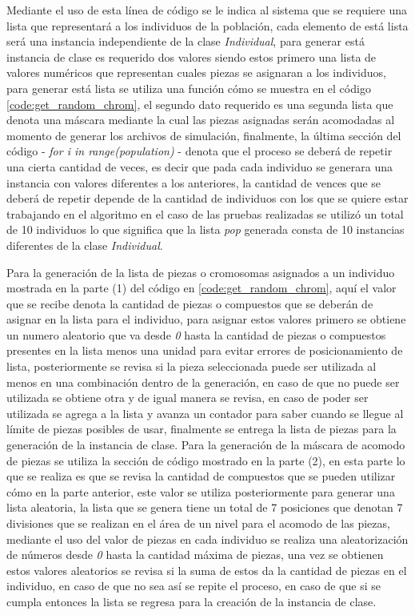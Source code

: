 Mediante el uso de esta línea de código se le indica al sistema que se requiere
una lista que representará a los individuos de la población, cada elemento de
está lista será una instancia independiente de la clase \textit{Individual},
para generar está instancia de clase es requerido dos valores siendo estos
primero una lista de valores numéricos que representan cuales piezas se
asignaran a los individuos, para generar está lista se utiliza una función cómo
se muestra en el código \ref{code:get_random_chrom}, el segundo dato requerido
es una segunda lista que denota una máscara mediante la cual las piezas
asignadas serán acomodadas al momento de generar los archivos de simulación,
finalmente, la última sección del código - \textit{for i in range(population)} -
denota que el proceso se deberá de repetir una cierta cantidad de veces, es
decir que pada cada individuo se generara una instancia con valores diferentes a
los anteriores, la cantidad de vences que se deberá de repetir depende de la
cantidad de individuos con los que se quiere estar trabajando en el algoritmo en
el caso de las pruebas realizadas se utilizó un total de 10 individuos lo que
significa que la lista \textit{pop} generada consta de 10 instancias diferentes
de la clase \textit{Individual}. 

Para la generación de la lista de piezas o cromosomas asignados a un individuo
mostrada en la parte (1) del código en \ref{code:get_random_chrom}, aquí el
valor que se recibe denota la cantidad de piezas o compuestos que se deberán de
asignar en la lista para el individuo, para asignar estos valores primero se
obtiene un numero aleatorio que va desde \textit{0} hasta la cantidad de piezas o
compuestos presentes en la lista menos una unidad para evitar errores de
posicionamiento de lista, posteriormente se revisa si la pieza seleccionada
puede ser utilizada al menos en una combinación dentro de la generación, en caso
de que no puede ser utilizada se obtiene otra y de igual manera se revisa, en
caso de poder ser utilizada se agrega a la lista y avanza un contador para saber
cuando se llegue al límite de piezas posibles de usar, finalmente se entrega la
lista de piezas para la generación de la instancia de clase. Para la generación
de la máscara de acomodo de piezas se utiliza la sección de código mostrado en
la parte (2), en esta parte lo que se realiza es que se revisa la cantidad de
compuestos que se pueden utilizar cómo en la parte anterior, este valor se
utiliza posteriormente para generar una lista aleatoria, la lista que se genera
tiene un total de 7 posiciones que denotan 7 divisiones que se realizan en el
área de un nivel para el acomodo de las piezas, mediante el uso del valor de
piezas en cada individuo se realiza una aleatorización de números desde
\textit{0} hasta la cantidad máxima de piezas, una vez se obtienen estos valores
aleatorios se revisa si la suma de estos da la cantidad de piezas en el
individuo, en caso de que no sea así se repite el proceso, en caso de que si se
cumpla entonces la lista se regresa para la creación de la instancia de clase.

